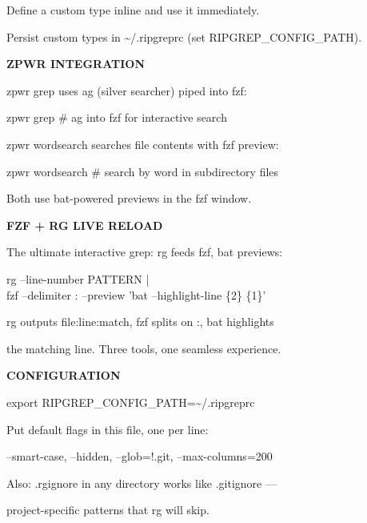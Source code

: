 \documentclass[11pt,a4paper,twoside]{book}
\begin{document}
Define a custom type inline and use it immediately.

Persist custom types in \textasciitilde{}/.ripgreprc (set RIPGREP\_CONFIG\_PATH).


\vspace{12pt}
{\bfseries\color{neonyellow} ZPWR INTEGRATION}\vspace{4pt}

zpwr grep uses ag (silver searcher) piped into fzf:

\begin{codebox}
zpwr grep            \# ag into fzf for interactive search\\
\end{codebox}

zpwr wordsearch searches file contents with fzf preview:

\begin{codebox}
zpwr wordsearch      \# search by word in subdirectory files\\
\end{codebox}

Both use bat-powered previews in the fzf window.


\vspace{12pt}
{\bfseries\color{neonyellow} FZF + RG LIVE RELOAD}\vspace{4pt}

The ultimate interactive grep: rg feeds fzf, bat previews:

\begin{codebox}
rg --line-number PATTERN |\\
fzf --delimiter : --preview 'bat --highlight-line \{2\} \{1\}'\\
\end{codebox}

rg outputs file:line:match, fzf splits on :, bat highlights

the matching line. Three tools, one seamless experience.


\vspace{12pt}
{\bfseries\color{neonyellow} CONFIGURATION}\vspace{4pt}

export RIPGREP\_CONFIG\_PATH=\textasciitilde{}/.ripgreprc

Put default flags in this file, one per line:

--smart-case, --hidden, --glob=!.git, --max-columns=200

Also: .rgignore in any directory works like .gitignore —

project-specific patterns that rg will skip.
\end{document}

